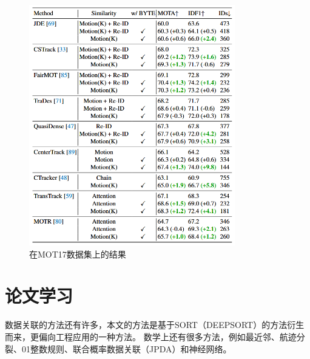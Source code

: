 \begin{figure}[H]
	\centering
	\includegraphics[width=0.8\textwidth]{images/BYTE/result1.png}
	\caption{在MOT17数据集上的结果}
	\label{btye_1}
\end{figure}


\section{论文学习}
数据关联的方法还有许多，本文的方法是基于SORT（DEEPSORT）的方法衍生而来，更偏向工程应用的一种方法。
数学上还有很多方法，例如最近邻、航迹分裂、01整数规则、联合概率数据关联（JPDA）和神经网络。
